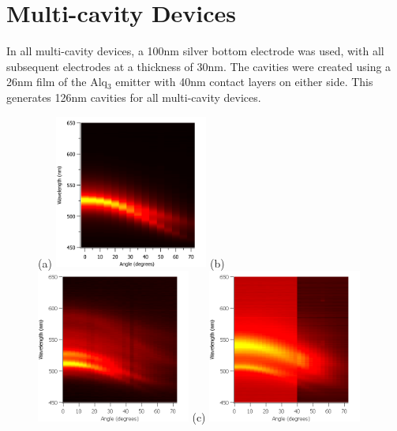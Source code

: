 \documentclass{report}
\begin{document}
    \section{Multi-cavity Devices} \label{n>1}
        In all multi-cavity devices, a 100nm silver bottom electrode was used, with all subsequent electrodes at a thickness of 30nm. The cavities were created using a 26nm film of the Alq$_3$ emitter with 40nm contact layers on either side. This generates 126nm cavities for all multi-cavity devices.
		\begin{figure}[h!]
            \centering
            (a)
            \includegraphics[width=0.45\textwidth]{images/n2_heatmap.png}
            (b)
            \includegraphics[width=0.45\textwidth]{images/n3_heatmap.png}
            \newline
            (c)
            \includegraphics[width=0.45\textwidth]{images/n4_heatmap.png}

\end{figure}
\end{document}
